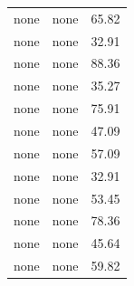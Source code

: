 \begin{tabular}{rrr}
none & none & 65.82 \\
none & none & 32.91 \\
none & none & 88.36 \\
none & none & 35.27 \\
none & none & 75.91 \\
none & none & 47.09 \\
none & none & 57.09 \\
none & none & 32.91 \\
none & none & 53.45 \\
none & none & 78.36 \\
none & none & 45.64 \\
none & none & 59.82 \\
\bottomrule
\end{tabular}
